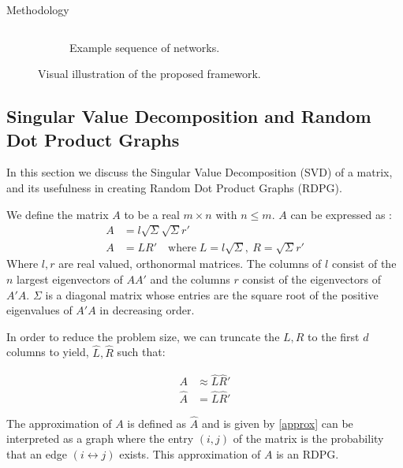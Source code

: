 \documentclass[12pt]{amsart}
\begin{document}
\begin{section}{Methodology}
\begin{figure}
\begin{subfigure}[c]{1\textwidth}
\begin{tabular}{llll}
                \end{tabular}
                \caption{Example sequence of networks.}
                \label{method nets}
                
            \end{subfigure}

            \caption{Visual illustration of the proposed framework.}
            \label{framework illustration}
        \end{figure} 

    \subsection{Singular Value Decomposition and Random Dot Product Graphs}
            \label{svd}
            In this section we discuss the Singular Value Decomposition (SVD) of a matrix, and its usefulness in creating Random Dot Product Graphs (RDPG).

            We define the matrix $A$ to be a real $m \times n$ with $n \le m$. $A$ can be expressed as \cite{forsythe1967computer}:
            \begin{align}
                A&=l\sqrt{\Sigma} \sqrt{\Sigma} r' \\
                A&=L R' \quad \text{where} \; L=l\sqrt \Sigma,\: R=\sqrt \Sigma r'
            \end{align}
            Where $l, r$ are real valued, orthonormal matrices. The columns of $l$ consist of the $n$ largest eigenvectors of $AA'$ and the columns $r$ consist of the eigenvectors of $A'A$. $\Sigma$ is a diagonal matrix whose entries are the square root of the positive eigenvalues of $A'A$ in decreasing order.

            In order to reduce the problem size, we can truncate the $L,R$ to the first $d$ columns to yield, $\hat L, \hat R$ such that:

            \begin{align}
                A &\approx \hat L \hat R' \\
                \hat A &= \hat L \hat R'
                \label{approx}
            \end{align}


            The approximation of $A$ is defined as $\hat A$ and is given by \autoref{approx} can be interpreted as a graph where the entry $(i,j)$ of the matrix is the probability that an edge $(i \leftrightarrow j)$ exists. This approximation of $A$ is an RDPG\cite{athreya2017statistical}.
     

\end{section}
\end{document}
